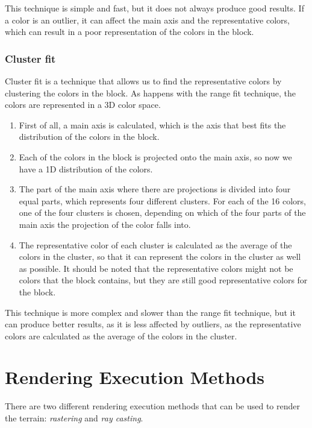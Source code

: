 This technique is simple and fast, but it does not always produce good results. If a color is an outlier, it can affect the main axis and the representative colors, which can result in a poor representation of the colors in the block.

\subsubsection{Cluster fit}

Cluster fit is a technique that allows us to find the representative colors by clustering the colors in the block. As happens with the range fit technique, the colors are represented in a 3D color space.
\begin{enumerate}
    \item First of all, a main axis is calculated, which is the axis that best fits the distribution of the colors in the block.
    \item Each of the colors in the block is projected onto the main axis, so now we have a 1D distribution of the colors.
    \item The part of the main axis where there are projections is divided into four equal parts, which represents four different clusters. For each of the 16 colors, one of the four clusters is chosen, depending on which of the four parts of the main axis the projection of the color falls into.
    \item The representative color of each cluster is calculated as the average of the colors in the cluster, so that it can represent the colors in the cluster as well as possible. It should be noted that the representative colors might not be colors that the block contains, but they are still good representative colors for the block.
\end{enumerate}

This technique is more complex and slower than the range fit technique, but it can produce better results, as it is less affected by outliers, as the representative colors are calculated as the average of the colors in the cluster.




\section{Rendering Execution Methods}

There are two different rendering execution methods that can be used to render the terrain: \emph{rastering} and \emph{ray casting}.

